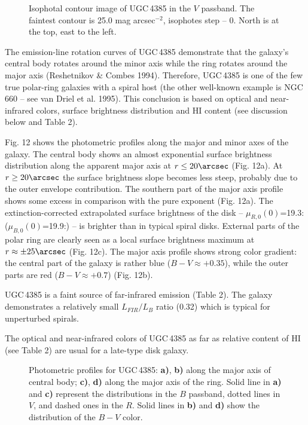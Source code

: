 \documentclass[]{aa}
\begin{document}
\begin{figure}
\centerline{}
\caption{Isophotal contour image of UGC\,4385 in the $V$ passband.
The faintest contour is 25.0 mag arcsec$^{-2}$, isophotes step --
0. North is at the top, east to the left.
}
\end{figure}

The emission-line rotation curves of UGC\,4385 demonstrate that
the galaxy's central body rotates around the minor axis while
the ring rotates around the major axis (Reshetnikov \& Combes 1994).
Therefore, UGC\,4385 is one of the few true polar-ring galaxies 
with a spiral host (the other well-known example is NGC\,660 -- 
see van Driel et al. 1995). This conclusion is based on optical and
near-infrared colors, surface brightness distribution and HI content (see
discussion below and Table 2).

Fig. 12 shows the photometric profiles along the major and minor
axes of the galaxy. The central body shows an almost exponential
surface brightness distribution along the apparent major axis
at $r \leq 20\arcsec$ (Fig. 12a). At $r \geq 20\arcsec$ the
surface brightness slope becomes less steep, probably due to
the outer envelope contribution. The southern part of the major axis
profile shows some excess in comparison with the pure exponent
(Fig. 12a). The extinction-corrected extrapolated surface brightness
of the disk -- $\mu_{R,0}(0)$=19.3: ($\mu_{B,0}(0)$=19.9:) -- 
is brighter than in
typical spiral disks. External parts of the polar ring are clearly
seen as a local surface brightness maximum at $r \approx \pm25\arcsec$
(Fig. 12c). The major axis profile shows strong color gradient:
the central part of the galaxy is rather blue ($B-V \approx +0.35$),
while the outer parts are red ($B-V \approx +0.7$) (Fig. 12b).

UGC\,4385 is a faint source of far-infrared emission (Table 2).
The galaxy demonstrates a relatively small $L_{FIR}/L_B$ ratio (0.32)
which is typical for unperturbed spirals. 

The optical and near-infrared colors of UGC\,4385
as far as relative content of HI (see Table 2) are usual for 
a late-type disk galaxy.

\begin{figure}
\centerline{}
\caption{Photometric profiles for UGC\,4385: {\bf a)}, {\bf b)}
along the major axis of central body;
{\bf c)}, {\bf d)} along the major axis of the ring.
Solid line in {\bf a)} and {\bf c)} represent the distributions in
the $B$ passband, dotted lines in $V$, and dashed ones in the $R$.
Solid lines in {\bf b)} and {\bf d)} show the distribution of the
$B-V$ color.}
\end{figure}
\end{document}

